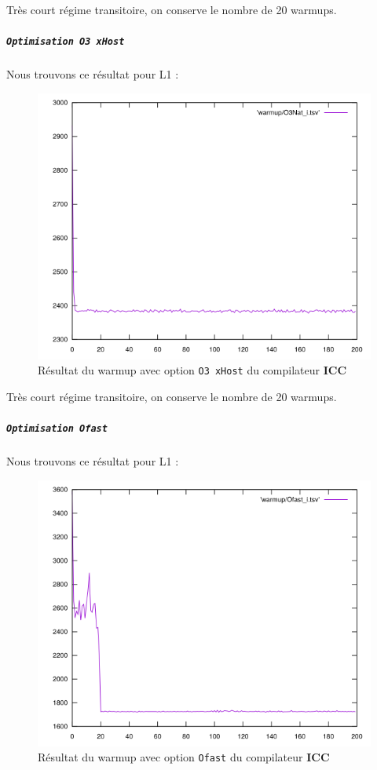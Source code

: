 \documentclass{report}
\begin{document}
Très court régime transitoire, on conserve le nombre de 20 warmups. 
\newpage
\subparagraph{ \texttt{Optimisation O3 xHost}}
Nous trouvons ce résultat pour L1 :
  \begin{figure}[ht!]
    \centering
    \includegraphics[scale=0.45]{resources/L1/warmup/O3Nat_i.png}
    \caption{Résultat du warmup avec option \texttt{O3 xHost} du compilateur \textbf{ICC}}
  \end{figure}
   
  Très court régime transitoire, on conserve le nombre de 20 warmups. 
  \newpage
\subparagraph{ \texttt{Optimisation Ofast}}
Nous trouvons ce résultat pour L1 :
  \begin{figure}[ht!]
    \centering
    \includegraphics[scale=0.45]{resources/L1/warmup/Ofast_i.png}
    \caption{Résultat du warmup avec option \texttt{Ofast} du compilateur \textbf{ICC}}
  \end{figure}
  
\end{document}
